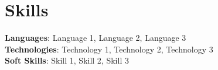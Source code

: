 \documentclass[letterpaper,11pt]{article}
\begin{document}
\section{Skills}
  \begin{itemize}[leftmargin=0.15in, label={}]
    \small{\item{
      \textbf{Languages}{: Language 1, Language 2, Language 3} \\
      \textbf{Technologies}{: Technology 1, Technology 2, Technology 3} \\
      \textbf{Soft Skills}{: Skill 1, Skill 2, Skill 3}
    }}
  \end{itemize}

\end{document}
